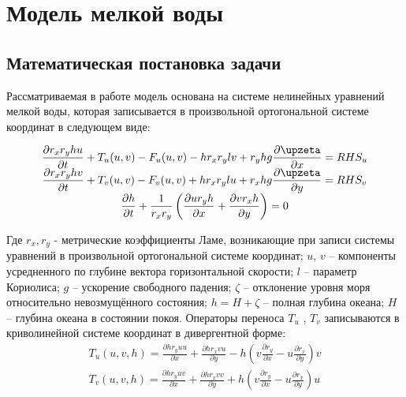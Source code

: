 \chapter{Модель мелкой воды}\label{ch:ch1}

\section{Математическая постановка задачи}\label{sec:ch1/sec1}

Рассматриваемая в работе модель основана на системе нелинейных уравнений мелкой воды, которая записывается в произвольной ортогональной системе координат
в следующем виде:

\begin{equation} \label{eq:ch1/sec1/1}
    \begin{array}{c}
        \displaystyle{ \d{r_x r_y h u}{t} + T_u(u, v) - F_u(u, v) - h r_x r_y l v + r_y h g \d{\zeta}{x} = RHS_u } \\

        \displaystyle{ \d{r_x r_y h v}{t} + T_v(u, v) - F_v(u, v) + h r_x r_y l u + r_x h g \d{\zeta}{y} = RHS_v } \\

        \displaystyle{ \d{h}{t} + \frac{1}{r_x r_y} \left( \d{u r_y h}{x} + \d{v r_x h}{y} \right) = 0 }
    \end{array}
\end{equation}

Где $r_x, r_y$ - метрические коэффициенты Ламе, возникающие при записи системы уравнений в произвольной ортогональной системе координат;
$u$, $v$ – компоненты усредненного по глубине вектора горизонтальной скорости; $l$ – параметр Кориолиса;
$g$ – ускорение свободного падения; $\zeta$ – отклонение уровня моря относительно невозмущённого состояния;
$h = H + \zeta$ – полная глубина океана; $H$ – глубина океана в состоянии покоя.
Операторы переноса $T_u$ , $T_v$ записываются в криволинейной системе координат в дивергентной форме:
\begin{equation} \label{eq:ch1/sec1/2}
    \begin{array}{c}
        \displaystyle{T_{u} (u,v,h)=\frac{\partial hr_{y} uu}{\partial x} +\frac{\partial hr_{x} vu}{\partial y} - h\left(v\frac{\partial r_{y} }{\partial x} -u\frac{\partial r_{x} }{\partial y} \right)v} \\

        \displaystyle{T_{v} (u,v,h)=\frac{\partial hr_{y} uv}{\partial x} +\frac{\partial hr_{x} vv}{\partial y} + h\left(v\frac{\partial r_{y} }{\partial x} -u\frac{\partial r_{x} }{\partial y} \right)u}
    \end{array}
\end{equation}

